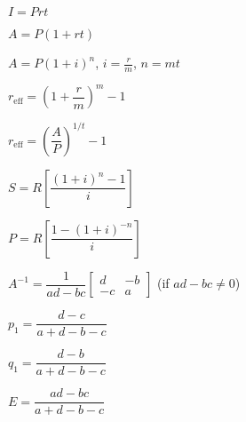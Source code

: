 \begin{enumerate}[label=\textbf{\Alph*.}]
\begin{minipage}{.3\textwidth}
\item \(I=Prt\)\\
\end{minipage}
\begin{minipage}{.3\textwidth}
\item \(A=P(1+rt)\)\\
\end{minipage}
\begin{minipage}{.3\textwidth}
\item \(A=P(1+i)^n\), \(i=\frac{r}{m}\), \(n=mt\)\\
\end{minipage}

\bigskip 

\begin{minipage}{.3\textwidth}
\item \(r_{\text{eff}}=\left(1+\dfrac{r}{m}\right)^m - 1\)\\
\end{minipage}
\begin{minipage}{.3\textwidth}
\item \(r_{\text{eff}} = \left(\dfrac{A}{P}\right)^{1/t} - 1\)\\
\end{minipage}
\begin{minipage}{.3\textwidth}
\item \(S = R\left[\dfrac{(1+i)^n-1}{i} \right]\)\\
\end{minipage}

\bigskip 

\begin{minipage}{.3\textwidth}
\item \(P = R\left[\dfrac{1-(1+i)^{-n}}{i} \right]\)\\
\end{minipage}
\begin{minipage}{.6\textwidth}
\item \(A^{-1} = \dfrac{1}{ad-bc}\begin{bmatrix} d & -b \\ -c & a\end{bmatrix}\) (if \(ad-bc\not=0\))\\
\end{minipage}

\bigskip 

\begin{minipage}{.3\textwidth}
\item \(p_1 = \dfrac{d-c}{a+d-b-c}\)\\
\end{minipage}
\begin{minipage}{.3\textwidth}
\item \(q_1 = \dfrac{d-b}{a+d-b-c}\)\\
\end{minipage}
\begin{minipage}{.3\textwidth}
\item \(E = \dfrac{ad-bc}{a+d-b-c}\)\\
\end{minipage}


\end{enumerate}
